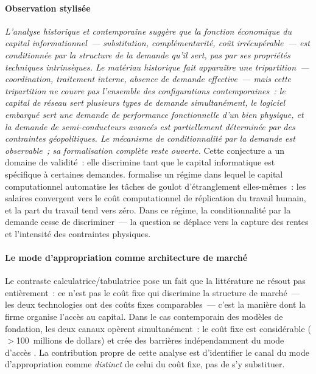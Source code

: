 \paragraph{Observation stylisée} \emph{L'analyse historique et contemporaine suggère que la fonction économique du capital informationnel~--- substitution, complémentarité, coût irrécupérable~--- est conditionnée par la structure de la demande qu'il sert, pas par ses propriétés techniques intrinsèques. Le matériau historique fait apparaître une tripartition~--- coordination, traitement interne, absence de demande effective~--- mais cette tripartition ne couvre pas l'ensemble des configurations contemporaines~: le capital de réseau sert plusieurs types de demande simultanément, le logiciel embarqué sert une demande de performance fonctionnelle d'un bien physique, et la demande de semi-conducteurs avancés est partiellement déterminée par des contraintes géopolitiques. Le mécanisme de conditionnalité par la demande est observable~; sa formalisation complète reste ouverte.} Cette conjecture a un domaine de validité~: elle discrimine tant que le capital informatique est spécifique à certaines demandes. \textcite{restrepo_wont_be_missed_2025} formalise un régime dans lequel le capital computationnel automatise les tâches de goulot d'étranglement elles-mêmes~: les salaires convergent vers le coût computationnel de réplication du travail humain, et la part du travail tend vers zéro. Dans ce régime, la conditionnalité par la demande cesse de discriminer~--- la question se déplace vers la capture des rentes et l'intensité des contraintes physiques.


\paragraph{Le mode d'appropriation comme architecture de marché}

\markINST
Le contraste calculatrice/tabulatrice pose un fait que la littérature ne résout pas entièrement~: ce n'est pas le coût fixe qui discrimine la structure de marché~--- les deux technologies ont des coûts fixes comparables~--- c'est la manière dont la firme organise l'accès au capital. Dans le cas contemporain des modèles de fondation, les deux canaux opèrent simultanément~: le coût fixe est considérable ($>$100~millions de dollars) et crée des barrières indépendamment du mode d'accès \parencite{athey_ai_competition_2025}. La contribution propre de cette analyse est d'identifier le canal du mode d'appropriation comme \emph{distinct} de celui du coût fixe, pas de s'y substituer.

